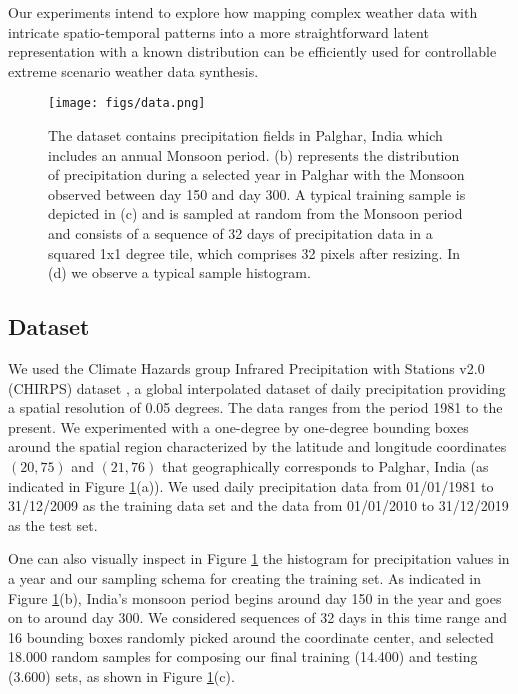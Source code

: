 \documentclass{article}
\begin{document}
Our experiments intend to explore how mapping complex weather data with intricate spatio-temporal patterns into a more straightforward latent representation with a known distribution can be efficiently used for controllable extreme scenario weather data synthesis.

\begin{figure}[h!]
	\centering
		\texttt{[image: figs/data.png]}
	\caption{The dataset contains precipitation fields in Palghar, India which includes an annual Monsoon period. (b) represents the distribution of precipitation during a selected year in Palghar with the Monsoon observed between day 150 and day 300. A typical training sample is depicted in (c) and is sampled at random from the Monsoon period and consists of a sequence of 32 days of precipitation data in a squared 1x1 degree tile, which comprises 32 pixels after resizing. In (d) we observe a typical sample histogram.}
	\label{fig:data}
\end{figure}

\subsection{Dataset}

We used the Climate Hazards group Infrared Precipitation with Stations v2.0 (CHIRPS) dataset \cite{funk2015climate}, a global interpolated dataset of daily precipitation providing a spatial resolution of 0.05 degrees. The data ranges from the period 1981 to the present. We experimented with a one-degree by one-degree bounding boxes around the spatial region characterized by the latitude and longitude coordinates $(20,75)$ and $(21,76)$ that geographically corresponds to Palghar, India (as indicated in Figure \ref{fig:data}(a)). We used daily precipitation data from 01/01/1981 to 31/12/2009 as the training data set and the data from 01/01/2010 to 31/12/2019 as the test set.

One can also visually inspect in Figure \ref{fig:data} the histogram for precipitation values in a year and our sampling schema for creating the training set. As indicated in Figure \ref{fig:data}(b), India's monsoon period begins around day 150 in the year and goes on to around day 300. We considered sequences of 32 days in this time range and 16 bounding boxes randomly picked around the coordinate center, and selected 18.000 random samples for composing our final training (14.400) and testing (3.600) sets, as shown in Figure \ref{fig:data}(c). 
\end{document}
